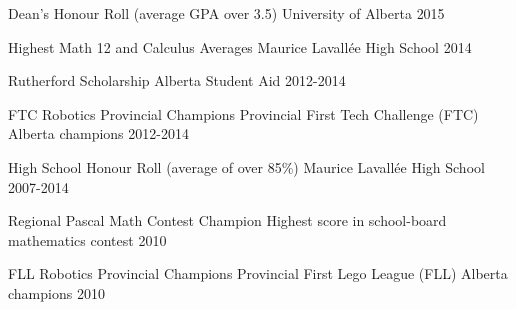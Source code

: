 







\addvspace{1ex}

\begin{cvhonors}


\cvhonor
{Dean's Honour Roll (average GPA over 3.5)} %
{University of Alberta} %
{} %
{2015} %

\cvhonor
{Highest Math 12 and Calculus Averages} %
{Maurice Lavallée High School} %
{} %
{2014} %

\cvhonor
{Rutherford Scholarship} %
{Alberta Student Aid} %
{} %
{2012-2014} %


\cvhonor
{FTC Robotics Provincial Champions} %
{Provincial First Tech Challenge (FTC) Alberta champions} %
{} %
{2012-2014} %


\cvhonor
{High School Honour Roll (average of over 85\%)} %
{Maurice Lavallée High School} %
{} %
{2007-2014} %


\cvhonor
{Regional Pascal Math Contest Champion} %
{Highest score in school-board mathematics contest} %
{} %
{2010} %

\cvhonor
{FLL Robotics Provincial Champions} %
{Provincial First Lego League (FLL) Alberta champions} %
{} %
{2010} %

\end{cvhonors}
